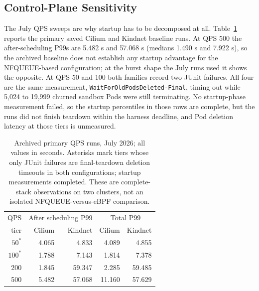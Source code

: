 \subsection{Control-Plane Sensitivity}
\label{sec:eval-qps}
The July QPS sweeps are why startup has to be decomposed at all.
Table~\ref{tab:qps} reports the primary saved Cilium and Kindnet baseline
runs. At QPS 500 the after-scheduling P99s are 5.482 s and 57.068 s
(medians 1.490 s and 7.922 s), so the archived baseline does not
establish any startup advantage for the NFQUEUE-based configuration; at
the burst shape the July runs used it shows the opposite. At QPS 50 and
100 both families record two JUnit failures. All four are the same
measurement, \texttt{WaitForOldPodsDeleted-Final}, timing out while 5,024
to 19,999 churned sandbox Pods were still terminating. No startup-phase
measurement failed, so the startup percentiles in those rows are
complete, but the runs did not finish teardown within the harness
deadline, and Pod deletion latency at those tiers is unmeasured.

\begin{table}[t]
\centering
\small
\begin{tabular}{rrrrr}
\toprule
QPS & \multicolumn{2}{c}{After scheduling P99} & \multicolumn{2}{c}{Total P99}\\
tier & Cilium & Kindnet & Cilium & Kindnet\\
\midrule
$50^{*}$ & 4.065 & 4.833 & 4.089 & 4.855\\
$100^{*}$ & 1.788 & 7.143 & 1.814 & 7.378\\
200 & 1.845 & 59.347 & 2.285 & 59.485\\
500 & 5.482 & 57.068 & 11.160 & 57.629\\
\bottomrule
\end{tabular}
\caption{Archived primary QPS runs, July 2026; all values in seconds.
Asterisks mark tiers whose only JUnit failures are final-teardown
deletion timeouts in both configurations; startup measurements
completed. These are complete-stack observations on two clusters, not an
isolated NFQUEUE-versus-eBPF comparison.}
\label{tab:qps}
\end{table}


